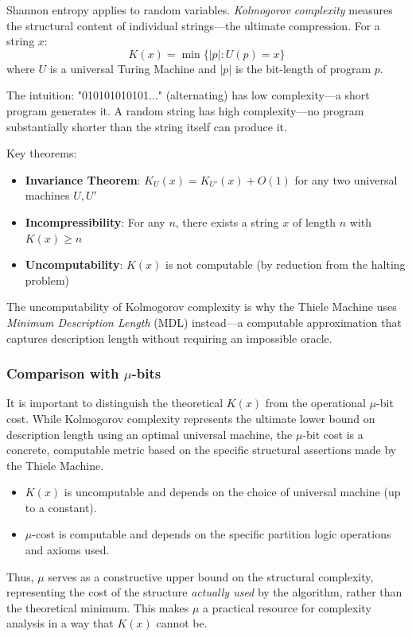 Shannon entropy applies to random variables. \textit{Kolmogorov complexity} measures the structural content of individual strings---the ultimate compression. For a string $x$:
\[
K(x) = \min \{|p| : U(p) = x\}
\]
where $U$ is a universal Turing Machine and $|p|$ is the bit-length of program $p$.

The intuition: "010101010101..." (alternating) has low complexity---a short program generates it. A random string has high complexity---no program substantially shorter than the string itself can produce it.

Key theorems:
\begin{itemize}
    \item \textbf{Invariance Theorem}: $K_U(x) = K_{U'}(x) + O(1)$ for any two universal machines $U, U'$
    \item \textbf{Incompressibility}: For any $n$, there exists a string $x$ of length $n$ with $K(x) \ge n$
    \item \textbf{Uncomputability}: $K(x)$ is not computable (by reduction from the halting problem)
\end{itemize}

The uncomputability of Kolmogorov complexity is why the Thiele Machine uses \textit{Minimum Description Length} (MDL) instead---a computable approximation that captures description length without requiring an impossible oracle.

\subsubsection{Comparison with $\mu$-bits}

It is important to distinguish the theoretical $K(x)$ from the operational $\mu$-bit cost. While Kolmogorov complexity represents the ultimate lower bound on description length using an optimal universal machine, the $\mu$-bit cost is a concrete, computable metric based on the specific structural assertions made by the Thiele Machine.
\begin{itemize}
    \item $K(x)$ is uncomputable and depends on the choice of universal machine (up to a constant).
    \item $\mu$-cost is computable and depends on the specific partition logic operations and axioms used.
\end{itemize}
Thus, $\mu$ serves as a constructive upper bound on the structural complexity, representing the cost of the structure \textit{actually used} by the algorithm, rather than the theoretical minimum. This makes $\mu$ a practical resource for complexity analysis in a way that $K(x)$ cannot be.

